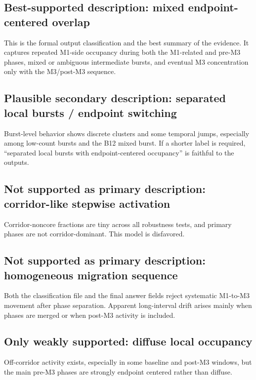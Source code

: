 \documentclass[11pt]{article}
\begin{document}
\subsection*{Best-supported description: mixed endpoint-centered overlap}
This is the formal output classification and the best summary of the evidence. It captures repeated M1-side occupancy during both the M1-related and pre-M3 phases, mixed or ambiguous intermediate bursts, and eventual M3 concentration only with the M3/post-M3 sequence.

\subsection*{Plausible secondary description: separated local bursts / endpoint switching}
Burst-level behavior shows discrete clusters and some temporal jumps, especially among low-count bursts and the B12 mixed burst. If a shorter label is required, ``separated local bursts with endpoint-centered occupancy'' is faithful to the outputs.

\subsection*{Not supported as primary description: corridor-like stepwise activation}
Corridor-noncore fractions are tiny across all robustness tests, and primary phases are not corridor-dominant. This model is disfavored.

\subsection*{Not supported as primary description: homogeneous migration sequence}
Both the classification file and the final answer fields reject systematic M1-to-M3 movement after phase separation. Apparent long-interval drift arises mainly when phases are merged or when post-M3 activity is included.

\subsection*{Only weakly supported: diffuse local occupancy}
Off-corridor activity exists, especially in some baseline and post-M3 windows, but the main pre-M3 phases are strongly endpoint centered rather than diffuse.
\end{document}
